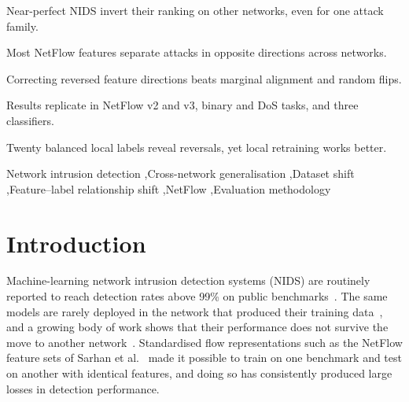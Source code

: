 \documentclass[preprint,12pt]{elsarticle}
\begin{document}
\begin{frontmatter}
\begin{highlights}
\item Near-perfect NIDS invert their ranking on other networks, even for one attack family.
\item Most NetFlow features separate attacks in opposite directions across networks.
\item Correcting reversed feature directions beats marginal alignment and random flips.
\item Results replicate in NetFlow v2 and v3, binary and DoS tasks, and three classifiers.
\item Twenty balanced local labels reveal reversals, yet local retraining works better.
\end{highlights}

\begin{keyword}
Network intrusion detection \sep Cross-network generalisation \sep Dataset shift \sep Feature--label relationship shift \sep NetFlow \sep Evaluation methodology
\end{keyword}

\end{frontmatter}

\section{Introduction}
\label{sec:intro}

Machine-learning network intrusion detection systems (NIDS) are routinely reported to reach detection rates above 99\% on public benchmarks~\cite{sarhan2021netflow,sarhan2022standard}. The same models are rarely deployed in the network that produced their training data~\cite{sommer2010outside}, and a growing body of work shows that their performance does not survive the move to another network~\cite{dhooge2020inter,apruzzese2022cross,layeghy2023explainable,sarhan2022evaluating}. Standardised flow representations such as the NetFlow feature sets of Sarhan et al.~\cite{sarhan2021netflow,sarhan2022standard} made it possible to train on one benchmark and test on another with identical features, and doing so has consistently produced large losses in detection performance.
\end{document}

